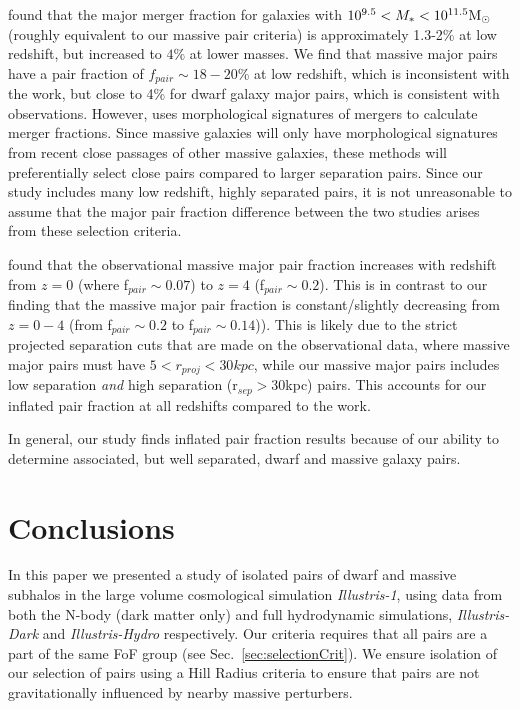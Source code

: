 \documentclass[twocolumn]{aastex63}
\newcommand\msun{\rm{M}_{\odot}}
\begin{document}
\citet[]{casteels14} found that the major merger fraction for galaxies with $10^{9.5}< M_* < 10^{11.5}\msun$ (roughly equivalent to our massive pair criteria) is approximately 1.3-2\% at low redshift, but increased to $4\%$ at lower masses. We find that massive major pairs have a pair fraction of $f_{pair}\sim18-20$\% at low redshift, which is inconsistent with the \citet{casteels14} work, but close to 4\% for dwarf galaxy major pairs, which is consistent with observations. However, \citet{casteels14} uses morphological signatures of mergers to calculate merger fractions. Since massive galaxies will only have morphological signatures from recent close passages of other massive galaxies, these methods will preferentially select close pairs compared to larger separation pairs. Since our study includes many low redshift, highly separated pairs, it is not unreasonable to assume that the major pair fraction difference between the two studies arises from these selection criteria.

\citet{duncan19} found that the observational massive major pair fraction increases with redshift from $z=0$ (where f$_{pair}\sim0.07$) to $z=4$ (f$_{pair}\sim0.2$). This is in contrast to our finding that the massive major pair fraction is constant/slightly decreasing from $z=0-4$ (from f$_{pair}\sim0.2$ to f$_{pair}\sim0.14$)). This is likely due to the strict projected separation cuts that are made on the observational data, where massive major pairs must have $5<r_{proj}<30kpc$, while our massive major pairs includes low separation \textit{and} high separation (r$_{sep}>$30kpc) pairs. This accounts for our inflated pair fraction at all redshifts compared to the \citet[]{duncan19} work. 

In general, our study finds inflated pair fraction results because of our ability to determine associated, but well separated, dwarf and massive galaxy pairs. 








\section{Conclusions}\label{sec:conclusions}
In this paper we presented a study of isolated pairs of dwarf and massive subhalos in the large volume cosmological simulation \textit{Illustris-1}, using data from both the N-body (dark matter only) and full hydrodynamic simulations, \textit{Illustris-Dark} and \textit{Illustris-Hydro} respectively. Our criteria requires that all pairs are a part of the same FoF group (see Sec.~\ref{sec:selectionCrit}). We ensure isolation of our selection of pairs using a Hill Radius criteria to ensure that pairs are not gravitationally influenced by nearby massive perturbers.
\end{document}
